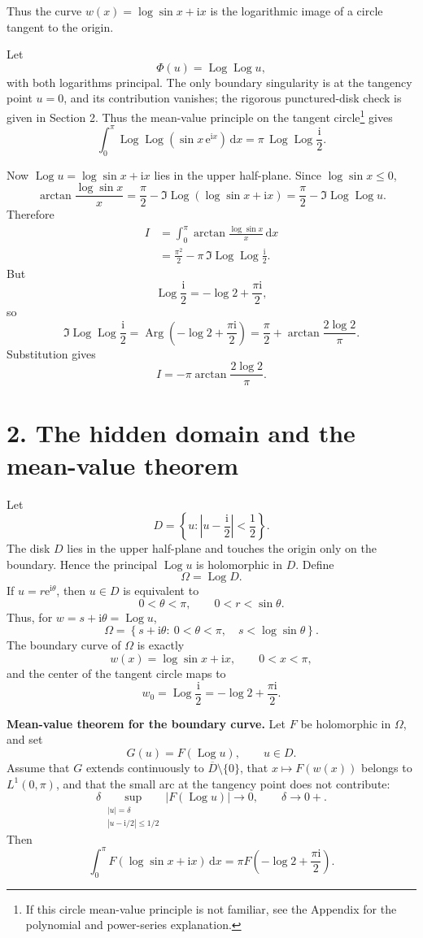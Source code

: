 \documentclass[12pt]{article}
\newcommand{\dd}{\,\mathrm{d}}
\newcommand{\ii}{\mathrm{i}}
\newcommand{\e}{\mathrm{e}}
\newcommand{\Log}{\operatorname{Log}}
\newcommand{\Arg}{\operatorname{Arg}}
\begin{document}
Thus the curve \(w(x)=\log\sin x+\ii x\) is the logarithmic image of a
circle tangent to the origin.

Let
\[
\Phi(u)=\Log\Log u,
\]
with both logarithms principal. The only boundary singularity is at the
tangency point \(u=0\), and its contribution vanishes; the rigorous
punctured-disk check is given in Section 2. Thus the mean-value principle
on the tangent circle\footnote{If this circle mean-value principle is not
familiar, see the Appendix for the polynomial and power-series explanation.}
gives
\[
\boxed{\displaystyle
\int_0^\pi \Log\Log(\sin x\,\e^{\ii x})\dd x
=\pi\,\Log\Log\frac{\ii}{2}.}
\tag{3}
\]

Now \(\Log u=\log\sin x+\ii x\) lies in the upper half-plane. Since
\(\log\sin x\le0\),
\[
\arctan\frac{\log\sin x}{x}
=\frac{\pi}{2}
-\Im\Log\!\left(\log\sin x+\ii x\right)
=\frac{\pi}{2}-\Im\Log\Log u.
\tag{4}
\]
Therefore
\[
\begin{aligned}
I
&=\int_0^\pi\arctan\frac{\log\sin x}{x}\dd x\\
&=\frac{\pi^2}{2}
-\pi\,\Im\Log\Log\frac{\ii}{2}.
\end{aligned}
\]
But
\[
\Log\frac{\ii}{2}=-\log2+\frac{\pi\ii}{2},
\]
so
\[
\Im\Log\Log\frac{\ii}{2}
=\Arg\!\left(-\log2+\frac{\pi\ii}{2}\right)
=\frac{\pi}{2}+\arctan\frac{2\log2}{\pi}.
\]
Substitution gives
\[
I=-\pi\arctan\frac{2\log2}{\pi}.
\]

\section*{2. The hidden domain and the mean-value theorem}

Let
\[
D=\left\{u:\left|u-\frac{\ii}{2}\right|<\frac12\right\}.
\]
The disk \(D\) lies in the upper half-plane and touches the origin only on
the boundary. Hence the principal \(\Log u\) is holomorphic in \(D\). Define
\[
\Omega=\Log D.
\]
If \(u=r\e^{\ii\theta}\), then \(u\in D\) is equivalent to
\[
0<\theta<\pi,\qquad 0<r<\sin\theta.
\]
Thus, for \(w=s+\ii\theta=\Log u\),
\[
\boxed{\displaystyle
\Omega=
\left\{
s+\ii\theta:\ 0<\theta<\pi,\quad s<\log\sin\theta
\right\}.}
\tag{5}
\]
The boundary curve of \(\Omega\) is exactly
\[
w(x)=\log\sin x+\ii x,\qquad 0<x<\pi,
\]
and the center of the tangent circle maps to
\[
w_0=\Log\frac{\ii}{2}
=-\log2+\frac{\pi\ii}{2}.
\tag{6}
\]

\textbf{Mean-value theorem for the boundary curve.}
Let \(F\) be holomorphic in \(\Omega\), and set
\[
G(u)=F(\Log u),\qquad u\in D.
\]
Assume that \(G\) extends continuously to
\(\overline D\setminus\{0\}\), that
\(x\mapsto F(w(x))\) belongs to \(L^1(0,\pi)\), and that the small arc
at the tangency point does not contribute:
\[
\delta
\sup_{\substack{|u|=\delta\\ |u-\ii/2|\le1/2}}
|F(\Log u)|\longrightarrow0,
\qquad \delta\to0+.
\tag{7}
\]
Then
\[
\boxed{\displaystyle
\int_0^\pi
F\!\left(\log\sin x+\ii x\right)\dd x
=
\pi F\!\left(-\log2+\frac{\pi\ii}{2}\right).}
\tag{8}
\]
\end{document}

